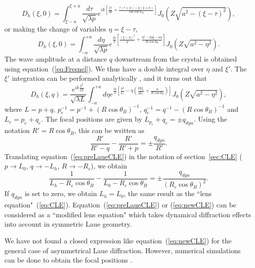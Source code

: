 \documentclass[preprint]{iucr}              %
\newcommand{\inred}[1]{{\color{red}#1}}
\begin{document}
\begin{equation}
    D_h(\xi,0)=\int_{\xi-a}^{\xi+a}\frac{d\tau}{\sqrt{\lambda p}}
    e^{ik\left[\frac{\tau^2}{2p}+\frac{\tau(\tau+a)-\xi(\xi+a)}{2R \cos\theta_B}\right]}
    J_0(Z\sqrt{a^2-(\xi-\tau)^2}),
\end{equation}
or making the change of variables $\eta=\xi-\tau$,
\begin{equation}
    D_h(\xi,0)=\int_{-a}^{+a}\frac{d\eta}{\sqrt{\lambda p}}
    e^{\frac{ik}{2}\left[\frac{(\xi-\eta)^2}{p}+\frac{\eta^2-2\eta\xi-a\eta}{R \cos\theta_B}\right]}
    J_0(Z\sqrt{a^2-\eta^2}).
\end{equation}
The wave amplitude at a distance $q$ downstream from the crystal is obtained using equation~(\ref{eq:Fresnel}). We thus have a double integral over $\eta$ and $\xi'$. The $\xi'$ integration can be performed analytically \cite{GuigayFerrero2013}, and it turns out that
\begin{equation}
\label{eq:Dhpropagated}
    D_h(\xi,q)=
    \frac{e^{i k \frac{\xi^2}{2L}}}{\sqrt{\lambda L}}
    \int_{-a}^{+a} d\eta
    e^{\frac{ik}{2}
    [\frac{\eta^2}{L_e}-\eta(
    \frac{2\xi q_e}{q L_e}+
    \frac{a}{R \cos\theta_B}
    )]}
    J_0(Z\sqrt{a^2-\eta^2}),
\end{equation}
where $L=p+q$, $p_e^{-1}=p^{-1}+(R\cos\theta_B)^{-1}$, $q_e^{-1}=q^{-1}-(R\cos\theta_B)^{-1}$ and $L_e=p_e+q_e$.
The focal positions are given by \inred{$L_p_e+q_e=\pm q_{dyn}$}. Using the notation $R'=R\cos\theta_B$, this can be written as
\begin{equation}
\label{eq:preLaueCLE}
    \frac{R'}{R'-q} - \frac{R'}{R' + p} = \pm \frac{q_{dyn}}{R'}.
\end{equation}
Translating equation~(\ref{eq:preLaueCLE}) in the notation of section~\ref{sec:CLE} ($p \to L_0$, $q \to -L_h$, $R \to -R_c$), we obtain
\begin{equation}
\label{eq:newCLE}
    \frac{1}{L_h-R_c \cos\theta_B} -
    \frac{1}{L_0 - R_c \cos\theta_B} =
    \pm \frac{q_{dyn}}{(R_c \cos\theta_B)^2}.
\end{equation}
If $q_{dyn}$ is set to zero, we obtain $L_h=L_0$, the same result as the ``lens equation"~(\ref{eq:CLE}).
Equation~(\ref{eq:preLaueCLE}) or (\ref{eq:newCLE}) can be considered as a ``modified lens equation" which takes dynamical diffraction effects into account in symmetric Laue geometry.

We have not found a closed expression like equation~(\ref{eq:newCLE}) for the general case of asymmetrical Laue diffraction. However, numerical simulations can be done to obtain the focal positions \cite{GuigayFerrero2016, Nesterets}.
\end{document}
